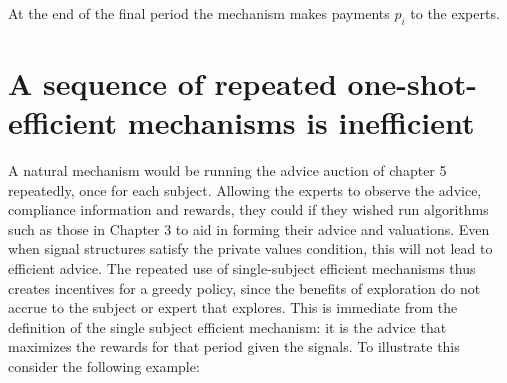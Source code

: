 At the end of the final period the mechanism makes payments $p_i$ to the experts.





\section{A sequence of repeated one-shot-efficient mechanisms is inefficient}

A natural mechanism would be running the advice auction of chapter 5 repeatedly, once for each subject. Allowing the experts to observe the advice, compliance information and rewards, they could if they wished run algorithms such as those in Chapter 3 to aid in forming their advice and valuations. 
Even when signal structures satisfy the private values condition, this will not lead to efficient advice.
The repeated use of single-subject efficient mechanisms thus creates incentives for a greedy policy, since the benefits of exploration do not accrue to the subject or expert that explores. 
This is immediate from the definition of the single subject efficient mechanism: it is the advice that maximizes the rewards for that period given the signals. 
To illustrate this consider the following example:

